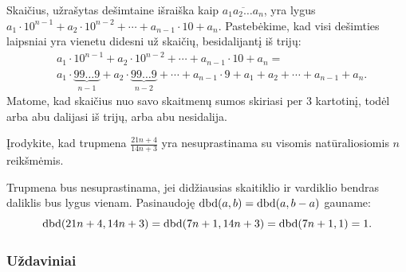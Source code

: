 \begin{sprendimas}
Skaičius, užrašytas dešimtaine išraiška kaip $\overline{a_1a_2\dots a_n}$,
yra lygus $a_1\cdot 10^{n-1} + a_2\cdot 10^{n-2} + \cdots + a_{n-1}\cdot 10 + a_n$.
Pastebėkime, kad visi dešimties laipsniai yra vienetu didesni už skaičių,
besidalijantį iš trijų:
\begin{align*}
  & a_1 \cdot 10^{n-1} + a_2  \cdot10^{n-2} + \cdots + a_{n-1} \cdot 10 + a_n = \\
  & a_1 \cdot \underbrace{99\dots 9}_{n-1} + a_2 \cdot \underbrace{99\dots 9}_{n-2} + \cdots
  + a_{n-1} \cdot 9 + a_1 + a_2 + \cdots + a_{n-1} + a_n.
\end{align*}
Matome, kad skaičius nuo savo skaitmenų sumos skiriasi per $3$ kartotinį,
todėl arba abu dalijasi iš trijų, arba abu nesidalija. 
\end{sprendimas}

\begin{pavnr}\text{\emph{[IMO 1959]}} Įrodykite, kad trupmena $\frac{21n+4}{14n+3}$ yra
  nesuprastinama su visomis natūraliosiomis $n$ reikšmėmis.
\end{pavnr}

\begin{sprendimas}
  Trupmena bus nesuprastinama, jei didžiausias skaitiklio ir vardiklio
  bendras daliklis bus lygus vienam. Pasinaudoję $\operatorname{dbd}(a,b) = \operatorname{dbd}(a, b-a)$
  gauname: $$\operatorname{dbd}(21n + 4, 14n + 3) = \operatorname{dbd}(7n+1, 14n+3) = \operatorname{dbd}(7n+1,1) =
  1.$$
\end{sprendimas}


\subsubsection{Uždaviniai}

